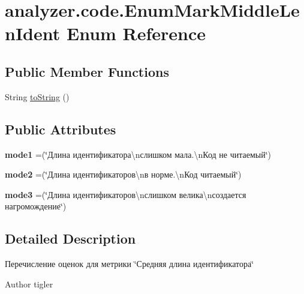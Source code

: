 \hypertarget{enumanalyzer_1_1code_1_1EnumMarkMiddleLenIdent}{}\section{analyzer.\+code.\+Enum\+Mark\+Middle\+Len\+Ident Enum Reference}
\label{enumanalyzer_1_1code_1_1EnumMarkMiddleLenIdent}
\subsection*{Public Member Functions}
\begin{DoxyCompactItemize}
\item 
String \hyperlink{enumanalyzer_1_1code_1_1EnumMarkMiddleLenIdent_a057938ee5095c35298a6c7741f7d0cb3}{to\+String} ()
\end{DoxyCompactItemize}
\subsection*{Public Attributes}
\begin{DoxyCompactItemize}
\item 
\mbox{\label{enumanalyzer_1_1code_1_1EnumMarkMiddleLenIdent_ae226ba41e31793d6073db62e639d1b6a}} 
{\bfseries mode1} =(\char`\"{}Длина идентификатора\textbackslash{}nслишком мала.\textbackslash{}nКод не читаемый\char`\"{})
\item 
\mbox{\label{enumanalyzer_1_1code_1_1EnumMarkMiddleLenIdent_a9f139e7a82637b8fe23235af49a17d9f}} 
{\bfseries mode2} =(\char`\"{}Длина идентификаторов\textbackslash{}nв норме.\textbackslash{}nКод читаемый\char`\"{})
\item 
\mbox{\label{enumanalyzer_1_1code_1_1EnumMarkMiddleLenIdent_a10054d78e462584beeb4666b2de03bb9}} 
{\bfseries mode3} =(\char`\"{}Длина идентификаторов\textbackslash{}nслишком велика\textbackslash{}nсоздается нагромождение\char`\"{})
\end{DoxyCompactItemize}


\subsection{Detailed Description}
Перечисление оценок для метрики \char`\"{}Средняя длина идентификатора\char`\"{} \begin{DoxyAuthor}{Author}
tigler 
\end{DoxyAuthor}


